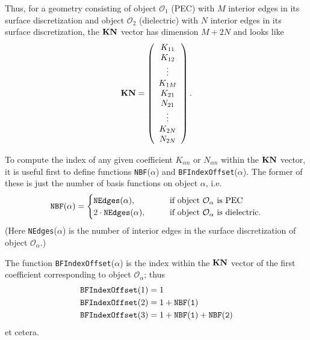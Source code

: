 \documentclass[letterpaper]{article}
\begin{document}
Thus, for a geometry consisting of object $\mathcal{O}_1$ (PEC)
with $M$ interior edges in its surface discretization
and object $\mathcal{O}_2$ (dielectric) with $N$ interior edges
in its surface discretization, the $\mathbf{KN}$ vector has dimension
$M+2N$ and looks like
$$ \mathbf{KN}=\left(\begin{array}{c}
   K_{11} \\ 
   K_{12} \\ 
   \vdots \\
   K_{1M} \\ 
   K_{21} \\ 
   N_{21} \\ 
   \vdots \\
   K_{2N} \\ 
   N_{2N}
   \end{array}\right).
$$

To compute the index of any given coefficient $K_{\alpha n}$ 
or $N_{\alpha n}$ within the $\mathbf{KN}$ vector,
it is useful first to define functions \texttt{NBF}($\alpha$) 
and \texttt{BFIndexOffset}($\alpha$). The former of these 
is just the number of basis functions on object $\alpha$,
i.e.
$$ \texttt{NBF}(\alpha) = 
   \begin{cases}
   \texttt{NEdges}(\alpha), \qquad &\text{if object $\mathcal{O}_\alpha$
                                          is PEC} \\
   2\cdot \tt{NEdges}(\alpha), 
                        \qquad &\text{if object $\mathcal{O}_\alpha$
                                      is dielectric.} \\
   \end{cases}
$$
(Here \texttt{NEdges}($\alpha$) is the number of interior edges 
in the surface discretization of object $\mathcal{O}_\alpha$.)

The function \texttt{BFIndexOffset}($\alpha$) is the index
within the $\mathbf{KN}$ vector of the first coefficient corresponding
to object $\mathcal{O}_\alpha$; thus 
\begin{align*}
 \texttt{BFIndexOffset}(1) &= 1 \\
 \texttt{BFIndexOffset}(2) &= 1 + \tt{NBF}(1) \\
 \texttt{BFIndexOffset}(3) &= 1 + \tt{NBF}(1) + \tt{NBF}(2) \\
\end{align*}
et cetera.
\end{document}
